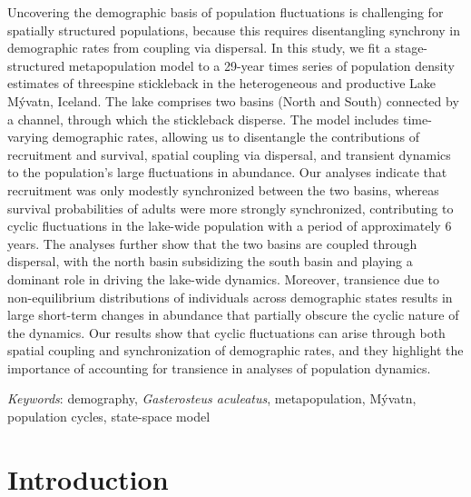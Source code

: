 \documentclass[11pt]{article}
\begin{document}
Uncovering the demographic basis of population fluctuations is challenging 
for spatially structured populations, 
because this requires disentangling synchrony in demographic rates 
from coupling via dispersal. 
In this study, we fit a stage-structured metapopulation model to a 29-year times series 
of population density estimates of threespine stickleback in the heterogeneous 
and productive Lake M\'{y}vatn, Iceland. 
The lake comprises two basins (North and South) connected by a channel, 
through which the stickleback disperse. 
The model includes time-varying demographic rates, 
allowing us to disentangle the contributions of recruitment and survival, 
spatial coupling via dispersal, and transient dynamics 
to the population’s large fluctuations in abundance. 
Our analyses indicate that recruitment was only modestly synchronized between the two basins, 
whereas survival probabilities of adults were more strongly synchronized, 
contributing to cyclic fluctuations in the lake-wide population 
with a period of approximately 6 years. 
The analyses further show that the two basins are coupled through dispersal, 
with the north basin subsidizing the south basin and playing a dominant role 
in driving the lake-wide dynamics. 
Moreover, transience due to non-equilibrium distributions of individuals 
across demographic states results in large short-term changes in abundance 
that partially obscure the cyclic nature of the dynamics. 
Our results show that cyclic fluctuations can arise through both spatial coupling 
and synchronization of demographic rates, and they highlight the importance 
of accounting for transience in analyses of population dynamics.


\bigskip

\textit{Keywords}: {demography, \textit{Gasterosteus aculeatus}, metapopulation,
                    M\'{y}vatn, population cycles, state-space model}

\clearpage




\section*{Introduction} \label{introduction}
\end{document}
